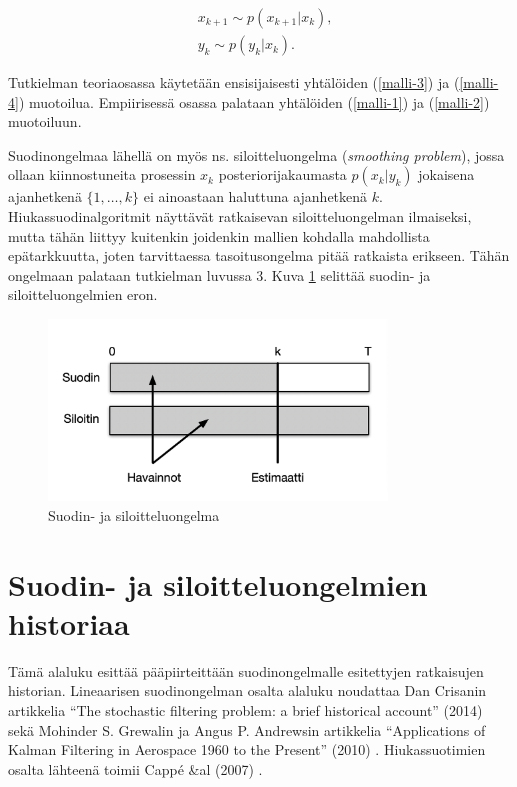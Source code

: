 \documentclass[
  12pt,
  a4paper, twoside]{book}
\begin{document}
\begin{align}
&\label{malli-3} x_{k+1} \sim p(x_{k+1}|x_k),\\
&\label{malli-4} y_{k} \sim p(y_k|x_k).
\end{align}

Tutkielman teoriaosassa käytetään ensisijaisesti yhtälöiden (\ref{malli-3}) ja (\ref{malli-4}) muotoilua. Empiirisessä osassa palataan yhtälöiden (\ref{malli-1}) ja (\ref{malli-2}) muotoiluun.

Suodinongelmaa lähellä on myös ns. siloitteluongelma (\emph{smoothing problem}), jossa ollaan kiinnostuneita prosessin \(x_k\) posteriorijakaumasta \(p(x_k|y_k)\) jokaisena ajanhetkenä \(\{1,\ldots,k\}\) ei ainoastaan haluttuna ajanhetkenä \(k\). Hiukassuodinalgoritmit näyttävät ratkaisevan siloitteluongelman ilmaiseksi, mutta tähän liittyy kuitenkin joidenkin mallien kohdalla mahdollista epätarkkuutta, joten tarvittaessa tasoitusongelma pitää ratkaista erikseen. Tähän ongelmaan palataan tutkielman luvussa 3. Kuva \ref{fig:suodin_vs_siloitin} selittää suodin- ja siloitteluongelmien eron.

\begin{figure}[H]
\centering
\includegraphics[width=9cm]{suodin_vs_siloitin_cropped}
\caption{Suodin- ja siloitteluongelma}
\label{fig:suodin_vs_siloitin}
\end{figure}

\section{Suodin- ja siloitteluongelmien historiaa}

Tämä alaluku esittää pääpiirteittään suodinongelmalle esitettyjen ratkaisujen historian. Lineaarisen suodinongelman osalta alaluku noudattaa Dan Crisanin artikkelia ``The stochastic filtering problem: a brief historical account'' (2014) \citep{crisan-2014} sekä Mohinder S. Grewalin ja Angus P. Andrewsin artikkelia ``Applications of Kalman Filtering in Aerospace 1960 to the Present'' (2010) \citep{Grewal-2010}. Hiukassuotimien osalta lähteenä toimii Cappé \&al (2007) \citep{cappe-2007}.
\end{document}
